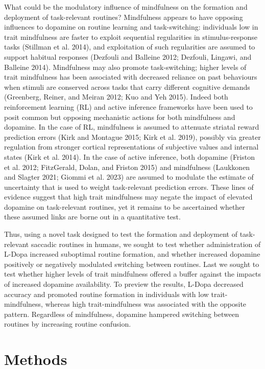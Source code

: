 \documentclass{article}
\begin{document}
What could be the modulatory influence of mindfulness on the formation
and deployment of task-relevant routines? Mindfulness appears to have
opposing influences to dopamine on routine learning and task-switching:
individuals low in trait mindfulness are faster to exploit sequential
regularities in stimulus-response tasks (Stillman et al. 2014), and
exploitation of such regularities are assumed to support habitual
responses (Dezfouli and Balleine 2012; Dezfouli, Lingawi, and Balleine
2014). Mindfulness may also promote task-switching; higher levels of
trait mindfulness has been associated with decreased reliance on past
behaviours when stimuli are conserved across tasks that carry different
cognitive demands (Greenberg, Reiner, and Meiran 2012; Kuo and Yeh
2015). Indeed both reinforcement learning (RL) and active inference
frameworks have been used to posit common but opposing mechanistic
actions for both mindfulness and dopamine. In the case of RL,
mindfulness is assumed to attenuate striatal reward prediction errors
(Kirk and Montague 2015; Kirk et al. 2019), possibly via greater
regulation from stronger cortical representations of subjective values
and internal states (Kirk et al. 2014). In the case of active inference,
both dopamine (Friston et al. 2012; FitzGerald, Dolan, and Friston 2015)
and mindfulness (Laukkonen and Slagter 2021; Giommi et al. 2023) are
assumed to modulate the estimate of uncertainty that is used to weight
task-relevant prediction errors. These lines of evidence suggest that
high trait mindfulness may negate the impact of elevated dopamine on
task-relevant routines, yet it remains to be ascertained whether these
assumed links are borne out in a quantitative test.

Thus, using a novel task designed to test the formation and deployment
of task-relevant saccadic routines in humans, we sought to test whether
administration of L-Dopa increased suboptimal routine formation, and
whether increased dopamine positively or negatively modulated switching
between routines. Last we sought to test whether higher levels of trait
mindfulness offered a buffer against the impacts of increased dopamine
availability. To preview the results, L-Dopa decreased accuracy and
promoted routine formation in individuals with low trait-mindfulness,
whereas high trait-mindfulness was associated with the opposite pattern.
Regardless of mindfulness, dopamine hampered switching between routines
by increasing routine confusion.

\hypertarget{methods}{%
\section{Methods}\label{methods}}
\end{document}
